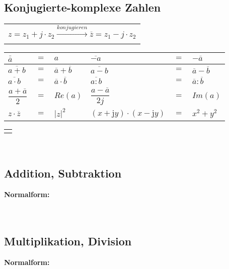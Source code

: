 		\renewcommand{\arraystretch}{1}
	\begin{minipage}[t]{0.5\textwidth}
		\subsection{Konjugierte-komplexe Zahlen}
			\begin{tabular}{c}
				$z = z_{1} + j \cdot z_{2} \xrightarrow[]{konjugieren} \overline{z} = z_{1} - j \cdot z_{2}$\\[3pt]
			\end{tabular}
			\renewcommand{\arraystretch}{1.7}
				\begin{tabular}{|lcl|lcl|}
					\hline
					$\overline{\overline{a}}$ & $=$ & $a$ & $\overline{-a}$ & $=$ & $-\overline{a}$\\[3pt]
					\hline
					$\overline{a + b}$ & $=$ & $\overline{a} + \overline{b}$ & $\overline{a - b}$ & $=$ & $\overline{a} - \overline{b}$\\[3pt]
					\hline
					$\overline{a \cdot b}$ & $=$ & $\overline{a} \cdot \overline{b}$ & $\overline{a : b}$ & $=$ & $\overline{a} : \overline{b}$\\[3pt]
					\hline
					$\dfrac{a + \overline{a}}{2}$ & $=$ & $ Re(a)$ & $\dfrac{a - \overline{a}}{2j}$ & $=$ & $Im(a)$\\[3pt]
					\hline
					$z \cdot \overline{z}$ & $=$ & $|z|^2$ & $(x + \mathrm{j} y) \cdot (x - \mathrm{j} y)$ & $=$ & $x^2 + y^2$\\[3pt]
					\hline
				\end{tabular}
			\renewcommand{\arraystretch}{1}
			\begin{tabular}{c}
				\scalebox{1}{}\\[3pt]
			\end{tabular}\\[3pt]
	\end{minipage}
	\begin{minipage}[t]{0.5\textwidth}
		\subsection{Addition, Subtraktion}
			\textbf{Normalform:}\\[3pt]
			\\[3pt]
			\\[3pt]
		\subsection{Multiplikation, Division}
			\textbf{Normalform:}\\[3pt]
			\\[3pt]
			\\[3pt]
			\scalebox{1}{}\\[3pt]
	\end{minipage}
	
